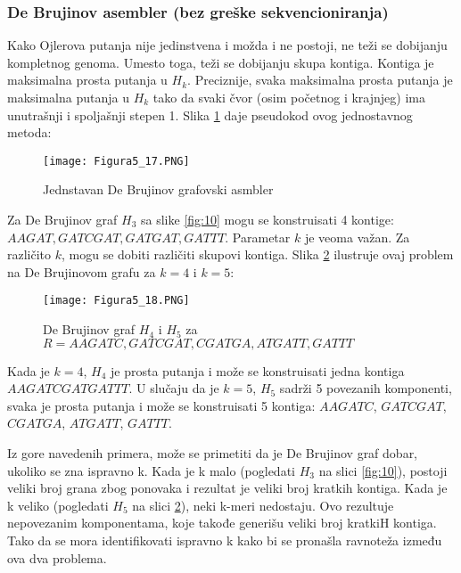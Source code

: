 \documentclass[12pt,oneside]{memoir}
\begin{document}
\subsubsection{De Brujinov asembler (bez greške sekvencioniranja)}

Kako Ojlerova putanja nije jedinstvena i možda i ne postoji, ne teži se dobijanju kompletnog genoma. Umesto toga, teži se dobijanju skupa kontiga. Kontiga je maksimalna prosta putanja u $H_k$. Preciznije, svaka maksimalna prosta putanja je maksimalna putanja u $H_k$ tako da svaki čvor (osim početnog i krajnjeg) ima unutrašnji i spoljašnji stepen 1. Slika \ref{fig:11} daje pseudokod ovog jednostavnog metoda:

\begin{figure}[!ht]
\centering
\texttt{[image: Figura5\_17.PNG]}
\caption{Jednstavan De Brujinov grafovski asmbler}
\label{fig:11}
\end{figure}

Za De Brujinov graf $H_3$ sa slike \ref{fig:10} mogu se konstruisati 4 kontige: $AAGAT, GATCGAT, GATGAT, GATTT$. Parametar $k$ je veoma važan. Za različito $k$, mogu se dobiti različiti skupovi kontiga. Slika \ref{fig:12} ilustruje ovaj problem na De Brujinovom grafu za $k = 4$ i $k = 5$:

\newpage

\begin{figure}[!ht]
\centering
\texttt{[image: Figura5\_18.PNG]}
\caption{De Brujinov graf $H_4$ i $H_5$ za $R = {AAGATC, GATCGAT, CGATGA, ATGATT, GATTT}$}
\label{fig:12}
\end{figure}

Kada je $k = 4$, $H_4$ je prosta putanja i može se konstruisati jedna kontiga $AAGATCGATGATTT$. U slučaju da je $k = 5$, $H_5$ sadrži 5 povezanih komponenti, svaka je prosta putanja i može se konstruisati 5 kontiga: $AAGATC$, $GATCGAT$, $CGATGA$, $ATGATT$, $GATTT$.

Iz gore navedenih primera, može se primetiti da je De Brujinov graf dobar, ukoliko se zna ispravno k. Kada je k malo (pogledati $H_3$ na slici \ref{fig:10}), postoji veliki broj grana zbog ponovaka i rezultat je veliki broj kratkih kontiga. Kada je k veliko (pogledati $H_5$ na slici \ref{fig:12}), neki k-meri nedostaju. Ovo rezultuje nepovezanim komponentama, koje takođe generišu veliki broj kratkiH kontiga. Tako da se mora identifikovati ispravno k kako bi se pronašla ravnoteža između ova dva problema.
\end{document}
